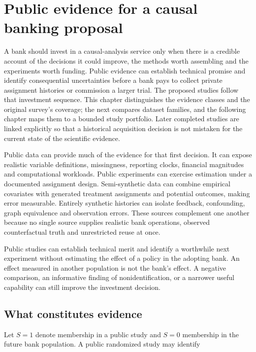 \hypertarget{pd15:evidence}{%
\chapter{Public evidence for a causal banking
proposal}\label{pd15:evidence}}

A bank should invest in a causal-analysis service only when there is a
credible account of the decisions it could improve, the methods worth
assembling and the experiments worth funding. Public evidence can establish
technical promise and identify consequential uncertainties before a bank
pays to collect private assignment histories or commission a larger trial.
The proposed studies follow that investment sequence. This chapter distinguishes the evidence classes and the original survey's coverage; the next compares dataset families, and the following chapter maps them to a bounded study portfolio. Later completed studies are linked explicitly so that a historical acquisition decision is not mistaken for the current state of the scientific evidence.

Public data can provide much of the evidence for that first decision. It
can expose realistic variable definitions, missingness, reporting
clocks, financial magnitudes and computational workloads. Public
experiments can exercise estimation under a documented assignment
design. Semi-synthetic data can combine empirical covariates with
generated treatment assignments and potential outcomes, making error
measurable. Entirely synthetic histories can isolate feedback,
confounding, graph equivalence and observation errors. These sources
complement one another because no single source supplies realistic bank
operations, observed counterfactual truth and unrestricted reuse at
once.

Public studies can establish technical merit and identify a worthwhile
next experiment without estimating the effect of a policy in the adopting
bank. An effect measured in another population is not the bank's effect.
A negative comparison, an informative finding of nonidentification, or a
narrower useful capability can still improve the investment decision.

\hypertarget{what-constitutes-evidence}{%
\section{What constitutes evidence}\label{what-constitutes-evidence}}

Let \(S=1\) denote membership in a public study and \(S=0\) membership
in the future bank population. A public randomized study may identify

